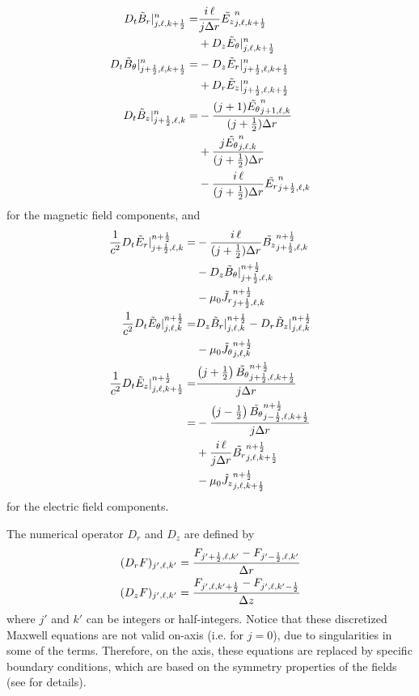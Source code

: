 \documentclass[]{report}
\begin{document}
\begin{subequations}
\begin{align}
%
D_{t}\tilde{B}_r|_{j,\ell,k+\hf}^{n} \nonumber
=& \frac{i\,\ell}{j\Delta r}\tEz{n}{j,\ell,k+\hf} \\ 
& + D_z \tilde{E}_{\theta}|^n_{j,\ell,k+\hf} \\
%
D_{t}\tilde{B}_\theta|_{j+\hf,\ell,k+\hf}^{n} \nonumber
=& -D_z \tilde{E}_r|^n_{j+\hf,\ell,k+\hf} \\
& + D_r \tilde{E}_z|^{n}_{j+\hf,\ell,k+\hf} \\
%
D_{t}\tilde{B}_z|_{j+\hf,\ell,k}^{n} =& \nonumber
 -\frac{(j+1)\tEt{n}{j+1,\ell,k} }{(j+\hf)\Delta r} \\ \nonumber
 & +\frac{ j\tEt{n}{j,\ell,k}}{(j+\hf)\Delta r} \\
 & - \frac{i\,\ell}{(j+\hf) \Delta r}\tEr{n}{j+\hf,\ell,k} 
\end{align}
\end{subequations}
for the magnetic field components, and 
\begin{subequations}
\begin{align}
%
\frac{1}{c^2}D_{t}\tilde{E}_r|_{j+\hf,\ell,k}^{n+\hf} \nonumber
=& -\frac{i\,\ell}{(j+\hf)\Delta r}\tBz{n+\hf}{j+\hf,\ell,k} \\
& - D_z \tilde{B}_{\theta}|^{n+\hf}_{j+\hf,\ell,k} \nonumber\\
& - \mu_0\tJr{n+\hf}{j+\hf,\ell,k} \\
%
\frac{1}{c^2}D_{t}\tilde{E}_\theta|_{j,\ell,k}^{n+\hf} \nonumber
=& D_z \tilde{B}_r|^{n+\hf}_{j,\ell,k} - D_r \tilde{B}_z|^{n+\hf}_{j,\ell,k} \\
& - \mu_0\tJt{n+\hf}{j,\ell,k} \\
%
\frac{1}{c^2}D_{t}\tilde{E}_z|_{j,\ell,k+\hf}^{n+\hf} \nonumber
=&   \frac{\left(j+\hf\right)\tBt{n+\hf}{j+\hf,\ell,k+\hf} }{j\Delta r} \\
=&   -\frac{\left(j-\hf\right)\tBt{n+\hf}{j-\hf,\ell,k+\hf}}{j\Delta r} \nonumber\\
& + \frac{i\,\ell}{j\Delta r}\tBr{n+\hf}{j,\ell,k+\hf} \nonumber\\
& - \mu_0\tJz{n+\hf}{j,\ell,k+\hf}
\end{align}
\end{subequations}
for the electric field components.

The numerical operator $D_r$ and $D_z$ are defined by
\begin{align*} 
(D_r F)_{j',\ell,k'} = \frac{F_{j'+\frac{1}{2},\ell,k'}-F_{j'-\frac{1}{2},\ell,k'} }{\Delta r} \\ 
(D_z F)_{j',\ell,k'} = \frac{F_{j',\ell,k'+\frac{1}{2}}-F_{j',\ell,k'-\frac{1}{2}} }{\Delta z} \\ 
\end{align*}
where $j'$ and $k'$ can be integers or half-integers. Notice 
that these discretized Maxwell equations are not valid on-axis (i.e. for $j=0$), due to
singularities in some of the terms. Therefore, on the axis, these equations are replaced by specific boundary conditions, which are based on the symmetry properties of the fields (see \cite{LifschitzJCP2009} for details).
\end{document}
